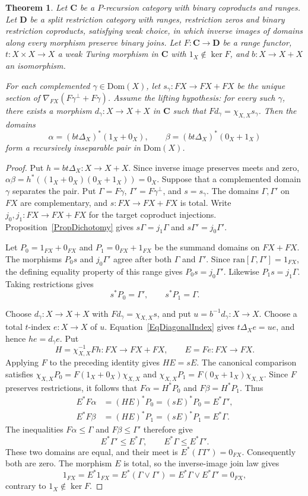 \documentclass[letterpaper,10pt]{amsart}
\theoremstyle{plain}
\newtheorem{thm}{Theorem}[section]
\theoremstyle{definition}
\begin{document}
\begin{thm}\label{ThmRecIns}
Let $\mathbf C$ be a $P$-recursion category with binary coproducts and
ranges. Let $\mathbf D$ be a split restriction category with ranges,
restriction zeros and binary restriction coproducts, satisfying weak
choice, in which inverse images of domains along every morphism preserve
binary joins. Let $F:\mathbf C\to\mathbf D$ be a range functor,
$t:X\times X\to X$ a weak Turing morphism in $\mathbf C$ with
$1_X\notin\ker F$, and $b:X\to X+X$ an isomorphism.

For each complemented $\gamma\in\mathrm{Dom}(X)$, let
$s_\gamma:FX\to FX+FX$ be the unique section of
$\nabla_{FX}(F\gamma^\perp+F\gamma)$. Assume the \textit{lifting
hypothesis}: for every such $\gamma$, there exists a morphism
$d_\gamma:X\to X+X$ in $\mathbf C$ such that
$Fd_\gamma=\chi_{X,X}s_\gamma$. Then the domains
\[
\alpha=(bt\Delta_X)^*(1_X+0_X),\qquad
\beta=(bt\Delta_X)^*(0_X+1_X)
\]
form a recursively inseparable pair in $\mathrm{Dom}(X)$.
\end{thm}
\begin{proof}
Put $h=bt\Delta_X:X\to X+X$. Since inverse image preserves meets
and zero, $\alpha\beta=h^*((1_X+0_X)(0_X+1_X))=0_X$.
Suppose that a complemented domain $\gamma$ separates the pair. Put
$\Gamma=F\gamma$, $\Gamma'=F\gamma^\perp$, and $s=s_\gamma$.
The domains $\Gamma,\Gamma'$ on $FX$ are complementary, and
$s:FX\to FX+FX$ is total. Write $j_0,j_1:FX\to FX+FX$ for the target
coproduct injections. Proposition~\ref{PropDichotomy} gives
$s\Gamma=j_1\Gamma$ and $s\Gamma'=j_0\Gamma'$.

Let $P_0=1_{FX}+0_{FX}$ and $P_1=0_{FX}+1_{FX}$ be the summand
domains on $FX+FX$. The morphisms $P_0s$ and $j_0\Gamma'$ agree
after both $\Gamma$ and $\Gamma'$. Since
$\mathrm{ran}[\Gamma,\Gamma']=1_{FX}$, the defining equality property of this range gives
$P_0s=j_0\Gamma'$. Likewise $P_1s=j_1\Gamma$. Taking restrictions
gives
\[
 s^*P_0=\Gamma',\qquad s^*P_1=\Gamma.
\]

Choose $d_\gamma:X\to X+X$ with
$Fd_\gamma=\chi_{X,X}s$, and put
$u=b^{-1}d_\gamma:X\to X$.
Choose a total $t$-index $e:X\to X$ of $u$.
Equation~\eqref{EqDiagonalIndex} gives
$t\Delta_Xe=ue$, and hence $he=d_\gamma e$.
Put
\[
 H=\chi_{X,X}^{-1}Fh:FX\to FX+FX,
 \qquad E=Fe:FX\to FX.
\]
Applying $F$ to the preceding identity gives $HE=sE$.
The canonical comparison satisfies
$\chi_{X,X}P_0=F(1_X+0_X)\chi_{X,X}$ and
$\chi_{X,X}P_1=F(0_X+1_X)\chi_{X,X}$.
Since $F$ preserves restrictions, it follows that
$F\alpha=H^*P_0$ and $F\beta=H^*P_1$. Thus
\[
 \begin{aligned}
 E^*F\alpha&=(HE)^*P_0=(sE)^*P_0=E^*\Gamma',\\
 E^*F\beta&=(HE)^*P_1=(sE)^*P_1=E^*\Gamma.
 \end{aligned}
\]
The inequalities $F\alpha\le\Gamma$ and $F\beta\le\Gamma'$
therefore give
\[
 E^*\Gamma'\le E^*\Gamma,\qquad E^*\Gamma\le E^*\Gamma'.
\]
These two domains are equal, and their meet is
$E^*(\Gamma\Gamma')=0_{FX}$. Consequently both are zero.
The morphism $E$ is total, so the inverse-image join law gives
\[
 1_{FX}=E^*1_{FX}
       =E^*(\Gamma\vee\Gamma')
       =E^*\Gamma\vee E^*\Gamma'=0_{FX},
\]
contrary to $1_X\notin\ker F$.
\end{proof}
\end{document}
